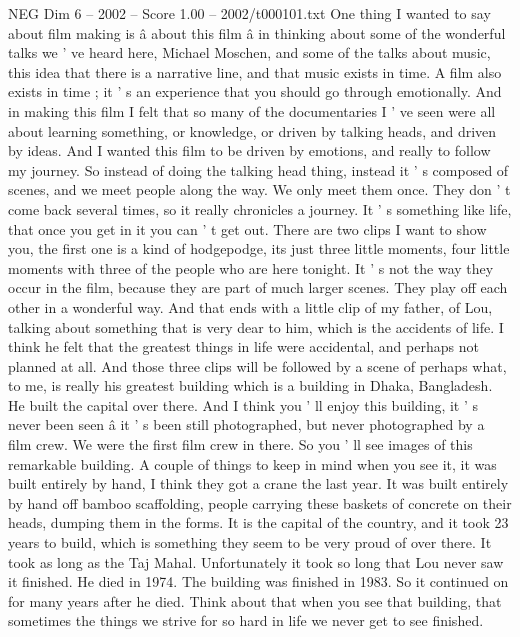 \begin{textsample}{NEG Dim 6 – 2002 – Score 1.00 – 2002/t000101.txt}  \label{ex:f6_neg_073}
One thing I wanted to say about film making is â about this film â in thinking about some of the wonderful talks we ' ve heard here, Michael Moschen, and some of the talks about music, this idea that there is a narrative line, and that music exists in time.
A film also exists in time ; it ' s an experience that you should go through emotionally.
And in making this film I felt that so many of the documentaries I ' ve seen were all about learning something, or knowledge, or driven by talking heads, and driven by ideas.
And I wanted this film to be driven by emotions, and really to follow my journey.
So instead of doing the talking head thing, instead it ' s composed of scenes, and we meet people along the way.
We only meet them once.
They don ' t come back several times, so it really chronicles a journey.
It ' s something like life, that once you get in it you can ' t get out.
There are two clips I want to show you, the first one is a kind of hodgepodge, its just three little moments, four little moments with three of the people who are here tonight.
It ' s not the way they occur in the film, because they are part of much larger scenes.
They play off each other in a wonderful way.
And that ends with a little clip of my father, of Lou, talking about something that is very dear to him, which is the accidents of life.
I think he felt that the greatest things in life were accidental, and perhaps not planned at all.
And those three clips will be followed by a scene of perhaps what, to me, is really his greatest building which is a building in Dhaka, Bangladesh.
He built the capital over there.
And I think you ' ll enjoy this building, it ' s never been seen â it ' s been still photographed, but never photographed by a film crew.
We were the first film crew in there.
So you ' ll see images of this remarkable building.
A couple of things to keep in mind when you see it, it was built entirely by hand, I think they got a crane the last year.
It was built entirely by hand off bamboo scaffolding, people carrying these baskets of concrete on their heads, dumping them in the forms.
It is the capital of the country, and it took 23 years to build, which is something they seem to be very proud of over there.
It took as long as the Taj Mahal.
Unfortunately it took so long that Lou never saw it finished.
He died in 1974.
The building was finished in 1983.
So it continued on for many years after he died.
Think about that when you see that building, that sometimes the things we strive for so hard in life we never get to see finished.

\end{textsample}
